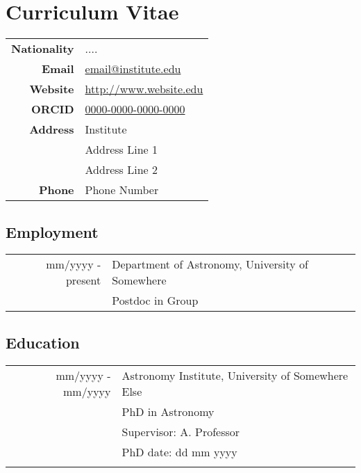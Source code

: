 \section{Curriculum Vitae}


\begin{tabular}{rl}

{\bfseries Nationality} & ....                     \\
{\bfseries Email}       & \href{mailto:email@institute.edu}{email@institute.edu} \\
{\bfseries Website}     & \href{http://www.website.edu}{http://www.website.edu} \\
{\bfseries ORCID}       & \href{http://orcid.org/0000-0000-0000-0000}{0000-0000-0000-0000} \\
{\bfseries Address}     & Institute \\
                        & Address Line 1 \\
                        & Address Line 2 \\
{\bfseries Phone}       & Phone Number \\

\end{tabular}




\subsection{Employment}

\begin{tabular}{rl}
mm/yyyy - present & Department of Astronomy, University of Somewhere \\
                  & Postdoc in Group \\
\end{tabular}




\subsection{Education}

\begin{tabular}{rl}

mm/yyyy - mm/yyyy & Astronomy Institute, University of Somewhere Else \\
                  & PhD in Astronomy \\
                  & Supervisor: A. Professor \\
                  & PhD date: dd mm yyyy \\
                  & \\

\end{tabular}


